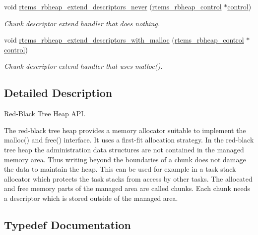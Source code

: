 \begin{DoxyCompactItemize}
void \mbox{\hyperlink{group__RBHeap_ga9896930146188b96df52a73099cf8d10}{rtems\+\_\+rbheap\+\_\+extend\+\_\+descriptors\+\_\+never}} (\mbox{\hyperlink{structrtems__rbheap__control}{rtems\+\_\+rbheap\+\_\+control}} $\ast$\mbox{\hyperlink{structcontrol}{control}})
\begin{DoxyCompactList}\small\item\em Chunk descriptor extend handler that does nothing. \end{DoxyCompactList}\item 
\mbox{\label{group__RBHeap_gaa1ea1346258fa0d79fc4ac9da02f761d}} 
void \mbox{\hyperlink{group__RBHeap_gaa1ea1346258fa0d79fc4ac9da02f761d}{rtems\+\_\+rbheap\+\_\+extend\+\_\+descriptors\+\_\+with\+\_\+malloc}} (\mbox{\hyperlink{structrtems__rbheap__control}{rtems\+\_\+rbheap\+\_\+control}} $\ast$\mbox{\hyperlink{structcontrol}{control}})
\begin{DoxyCompactList}\small\item\em Chunk descriptor extend handler that uses malloc(). \end{DoxyCompactList}\end{DoxyCompactItemize}


\subsection{Detailed Description}
Red-\/\+Black Tree Heap A\+PI. 

The red-\/black tree heap provides a memory allocator suitable to implement the malloc() and free() interface. It uses a first-\/fit allocation strategy. In the red-\/black tree heap the administration data structures are not contained in the managed memory area. Thus writing beyond the boundaries of a chunk does not damage the data to maintain the heap. This can be used for example in a task stack allocator which protects the task stacks from access by other tasks. The allocated and free memory parts of the managed area are called chunks. Each chunk needs a descriptor which is stored outside of the managed area. 

\subsection{Typedef Documentation}
\mbox{\label{group__RBHeap_gaa15b8f5425b4d2aa188607bb9941fb20}} 
